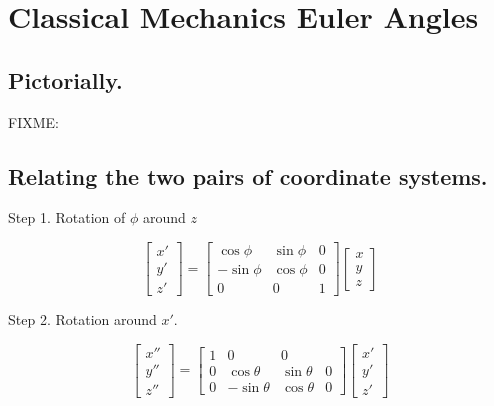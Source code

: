 
%

\chapter{Classical Mechanics Euler Angles}
\label{chap:classicalMechanicsEulerAngles}
{}
\date{Mar 21, 2012}

\beginArtWithToc

\section{Pictorially.}

FIXME:

\section{Relating the two pairs of coordinate systems.}

Step 1.  Rotation of $\phi$ around $z$

\begin{equation}\label{eqn:classicalMechanicsEulerAngles:n}
\begin{bmatrix}
x' \\
y' \\
z'
\end{bmatrix}
=
\begin{bmatrix}
\cos\phi & \sin\phi & 0 \\
-\sin\phi & \cos\phi & 0 \\
0 & 0 & 1
\end{bmatrix}
\begin{bmatrix}
x \\
y \\
z
\end{bmatrix}
\end{equation}

Step 2.  Rotation around $x'$.

\begin{equation}\label{eqn:classicalMechanicsEulerAngles:n}
\begin{bmatrix}
x'' \\
y'' \\
z''
\end{bmatrix}
=
\begin{bmatrix}
1 & 0 & 0 \\
0 & \cos\theta & \sin\theta & 0 \\
0 & -\sin\theta & \cos\theta & 0 
\end{bmatrix}
\begin{bmatrix}
x' \\
y' \\
z'
\end{bmatrix}
\end{equation}

